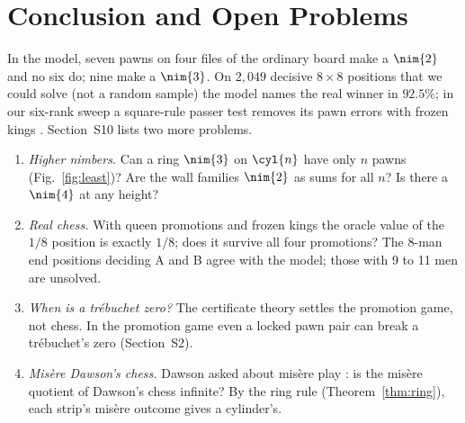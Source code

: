 \section{Conclusion and Open Problems}\label{sec:conclusion}

In the model, seven pawns on four files of the ordinary board make a $\nim{2}$ and no six do; nine make a
$\nim{3}$. On $2{,}049$ decisive $8\times8$ positions that we could solve (not a random sample) the model names the real winner in $92.5\%$; in our six-rank sweep a
square-rule passer test removes its pawn errors with frozen kings . Section~S10 lists two more problems.

\begin{enumerate}
\item \emph{Higher nimbers.} Can a ring $\nim{3}$ on $\cyl{n}$ have only $n$ pawns (Fig.~\ref{fig:least})? Are
  the wall families $\nim{2}$ as sums for all $n$? Is there a $\nim{4}$ at any height?
\item \emph{Real chess.} With queen promotions and frozen kings the oracle value of the $1/8$ position is exactly
  $1/8$; does it survive all four promotions? The 8-man end positions deciding A and B agree with the model;
  those with 9 to 11 men are unsolved.
\item \emph{When is a tr\'ebuchet zero?} The certificate theory settles the promotion game, not chess. In the promotion
  game even a locked pawn pair can break a tr\'ebuchet's zero  (Section~S2).
\item \emph{Mis\`ere Dawson's chess.} Dawson asked about mis\`ere play \cite{Dawson1935}: is the mis\`ere
  quotient \cite{PlambeckSiegel2008} of Dawson's chess infinite? By the ring rule (Theorem~\ref{thm:ring}), each
  strip's mis\`ere outcome gives a cylinder's.
\end{enumerate}
